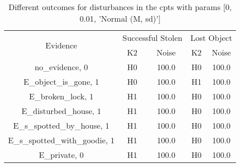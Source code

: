 \begin{table}\begin{tabular}{c|cc|cc}\toprule\multirow{2}{*}{Evidence} & \multicolumn{2}{c}{Successful Stolen} & \multicolumn{2}{c}{Lost Object} \\& {K2} & {Noise} & {K2} & {Noise} \\\midrule
no\_evidence, 0 & H0&100.0&H0&100.0\\E\_object\_is\_gone, 1 & H0&100.0&H1&100.0\\E\_broken\_lock, 1 & H1&100.0&H0&100.0\\E\_disturbed\_house, 1 & H1&100.0&H0&100.0\\E\_s\_spotted\_by\_house, 1 & H1&100.0&H0&100.0\\E\_s\_spotted\_with\_goodie, 1 & H1&100.0&H0&100.0\\E\_private, 0 & H1&100.0&H0&100.0\\\bottomrule\end{tabular}\caption{Different outcomes for disturbances in the cpts with params [0, 0.01, 'Normal (M, sd)']}\end{table}
